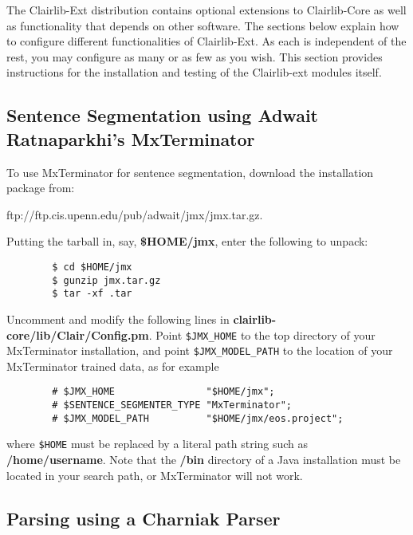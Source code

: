 The Clairlib-Ext distribution contains optional extensions to Clairlib-Core as well as functionality that depends on other software. The sections below explain how to configure different functionalities of Clairlib-Ext. As each is independent of the rest, you may configure as many or as few as you wish. This section provides instructions for the installation and testing of the Clairlib-ext modules itself.

\subsection*{Sentence Segmentation using Adwait Ratnaparkhi's MxTerminator\label{Sentence_Segmentation_using_Adwait_Ratnaparkhi_s_MxTerminator}}


To use MxTerminator for sentence segmentation, download the installation package from:



\textsf{ftp://ftp.cis.upenn.edu/pub/adwait/jmx/jmx.tar.gz}.



Putting the tarball in, say, \textbf{\$HOME/jmx}, enter the following to unpack:

\begin{verbatim}
        $ cd $HOME/jmx
        $ gunzip jmx.tar.gz
        $ tar -xf .tar
\end{verbatim}


Uncomment and modify the following lines in \textbf{clairlib-core/lib/Clair/Config.pm}. Point \texttt{\$JMX\_HOME} to the top directory of your MxTerminator installation, and point \texttt{\$JMX\_MODEL\_PATH} to the location of your MxTerminator trained data, as for example

\begin{verbatim}
        # $JMX_HOME                "$HOME/jmx";
        # $SENTENCE_SEGMENTER_TYPE "MxTerminator";
        # $JMX_MODEL_PATH          "$HOME/jmx/eos.project";
\end{verbatim}


where \texttt{\$HOME} must be replaced by a literal path string such as \textbf{/home/username}. Note that the \textbf{/bin} directory of a Java installation must be located in your search path, or MxTerminator will not work.

\subsection*{Parsing using a Charniak Parser\label{Parsing_using_a_Charniak_Parser}}


